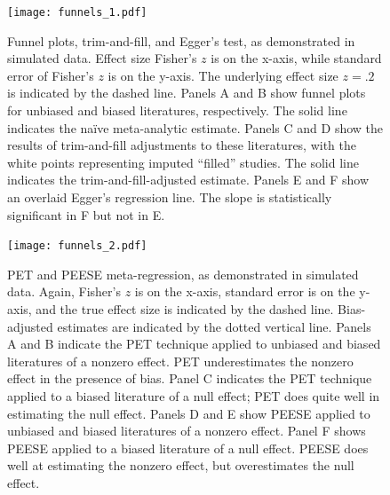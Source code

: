\documentclass[man]{apa6}
\begin{document}


\newpage



\begin{figure}
	\texttt{[image: funnels\_1.pdf]}
	\caption{Funnel plots, trim-and-fill, and Egger's test, as demonstrated in simulated data. Effect size Fisher's $z$ is on the x-axis, while standard error of Fisher's $z$ is on the y-axis. The underlying effect size $z = .2$ is indicated by the dashed line. Panels A and B show funnel plots for unbiased and biased literatures, respectively. The solid line indicates the na{\"i}ve meta-analytic estimate. Panels C and D show the results of trim-and-fill adjustments to these literatures, with the white points representing imputed ``filled'' studies. The solid line indicates the trim-and-fill-adjusted estimate. Panels E and F show an overlaid Egger's regression line. The slope is statistically significant in F but not in E.}
	\label{funnels1}
\end{figure}

\begin{figure}
	\texttt{[image: funnels\_2.pdf]}
	\caption{PET and PEESE meta-regression, as demonstrated in simulated data. Again, Fisher's $z$ is on the x-axis, standard error is on the y-axis, and the true effect size is indicated by the dashed line. Bias-adjusted estimates are indicated by the dotted vertical line. Panels A and B indicate the PET technique applied to unbiased and biased literatures of a nonzero effect. PET underestimates the nonzero effect in the presence of bias. Panel C indicates the PET technique applied to a biased literature of a null effect; PET does quite well in estimating the null effect. Panels D and E show PEESE applied to unbiased and biased literatures of a nonzero effect. Panel F shows PEESE applied to a biased literature of a null effect. PEESE does well at estimating the nonzero effect, but overestimates the null effect.}
	\label{funnels2}
\end{figure}
\end{document}
